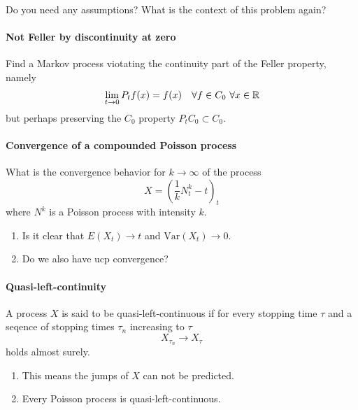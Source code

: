 Do you need any assumptions? What is the context of this problem again?  




\paragraph{Not Feller by discontinuity at zero}
Find a Markov process viotating the continuity part of 
the Feller property, namely
\begin{equation}
\lim_{t\to 0} P_t f(x) = f(x) \quad \forall f \in C_0 \ \forall x\in \mathbb R
\end{equation}
but perhaps preserving the $C_0$ property $P_t C_0 \subset C_0$.







\paragraph{Convergence of a compounded Poisson process}
What is the convergence behavior for $k\to \infty$ of the process 
\begin{equation}
X = \left(  \frac{1}{k} N_t^k - t  \right)_t
\end{equation}
where $N^k$ is a Poisson process with intensity $k$. 

\begin{enumerate}
\item Is it clear that $E\left( X_t \right) \to t$ and $\textrm{Var} \left( X_t \right)\to 0$.
\item Do we also have ucp convergence?
\end{enumerate}









\paragraph{Quasi-left-continuity}
A process $X$ is said to be quasi-left-continuous if for every stopping
time $\tau$ and a seqence of stopping times $\tau_n$ increasing to $\tau$
\begin{equation}
X_{\tau_n} \to X_{\tau}
\label{}
\end{equation}
holds almost surely.
\begin{enumerate}
\item This means the jumps of $X$ can not be predicted.
\item Every Poisson process is quasi-left-continuous.
\end{enumerate}





